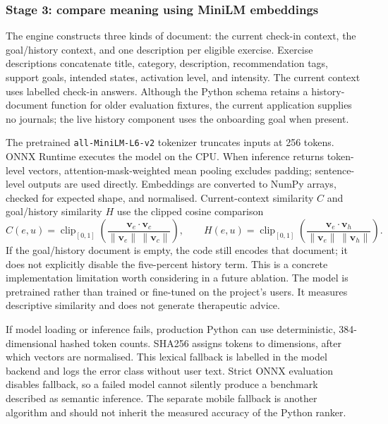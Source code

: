 \subsubsection{Stage 3: compare meaning using MiniLM embeddings}
\label{sec:stage-three}

The engine constructs three kinds of document: the current check-in context, the goal/history context, and one description per eligible exercise. Exercise descriptions concatenate title, category, description, recommendation tags, support goals, intended states, activation level, and intensity. The current context uses labelled check-in answers. Although the Python schema retains a history-document function for older evaluation fixtures, the current application supplies no journals; the live history component uses the onboarding goal when present.

The pretrained \texttt{all-MiniLM-L6-v2} tokenizer truncates inputs at 256 tokens. ONNX Runtime executes the model on the CPU. When inference returns token-level vectors, attention-mask-weighted mean pooling excludes padding; sentence-level outputs are used directly. Embeddings are converted to NumPy arrays, checked for expected shape, and normalised. Current-context similarity $C$ and goal/history similarity $H$ use the clipped cosine comparison
\begin{equation}
 C(e,u)=\operatorname{clip}_{[0,1]}\!\left(\frac{\mathbf v_e\cdot\mathbf v_c}{\|\mathbf v_e\|\,\|\mathbf v_c\|}\right),\qquad
 H(e,u)=\operatorname{clip}_{[0,1]}\!\left(\frac{\mathbf v_e\cdot\mathbf v_h}{\|\mathbf v_e\|\,\|\mathbf v_h\|}\right).
 \label{eq:semantic-score}
\end{equation}
If the goal/history document is empty, the code still encodes that document; it does not explicitly disable the five-percent history term. This is a concrete implementation limitation worth considering in a future ablation. The model is pretrained rather than trained or fine-tuned on the project's users. It measures descriptive similarity and does not generate therapeutic advice.

If model loading or inference fails, production Python can use deterministic, 384-dimensional hashed token counts. SHA256 assigns tokens to dimensions, after which vectors are normalised. This lexical fallback is labelled in the model backend and logs the error class without user text. Strict ONNX evaluation disables fallback, so a failed model cannot silently produce a benchmark described as semantic inference. The separate mobile fallback is another algorithm and should not inherit the measured accuracy of the Python ranker.

